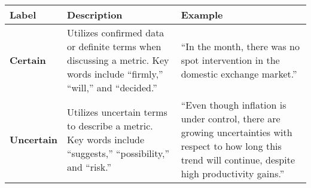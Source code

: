 \begin{table*}
    \caption{}
    \vspace{1em}
    \begin{tabular}{p{} p{} p{}}
    \toprule
    \textbf{Label} & \textbf{Description} & \textbf{Example} \\
    \midrule
    \textbf{Certain} & Utilizes confirmed data or definite terms when discussing a metric. Key words include ``firmly,'' ``will,'' and ``decided.'' & ``In the month, there was no spot intervention in the domestic exchange market.'' \\
    \midrule
    \textbf{Uncertain} & Utilizes uncertain terms to describe a metric. Key words include 
    ``suggests,'' ``possibility,'' and ``risk.'' & ``Even though inflation is under control, there are growing uncertainties with respect to how long this trend will continue, despite high productivity gains.'' \\
    \bottomrule
    \end{tabular}
    \label{tb:bcb_certainty_guide}
    \end{table*}